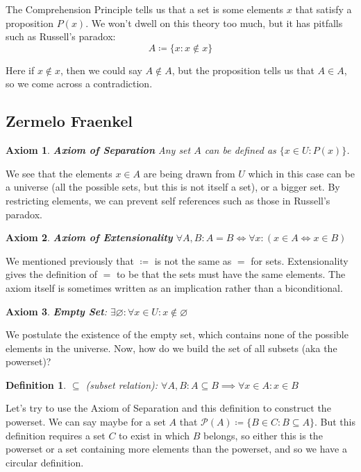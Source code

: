 \documentclass{article}
\newtheorem{defn}{Definition}[section]
\newtheorem{axm}{Axiom}[section]
\begin{document}
The Comprehension Principle tells us that a set is some elements $x$ that satisfy a proposition $P(x)$. We won't dwell on this theory too much, but it has pitfalls such as Russell's paradox:
\begin{equation*}
    A \coloneq \{x : x \notin x\}
\end{equation*}

Here if $x \notin x$, then we could say $A \notin A$, but the proposition tells us that $A \in A$, so we come across a contradiction.\\

\subsection{Zermelo Fraenkel}
\begin{axm}
    \textbf{Axiom of Separation} Any set $A$ can be defined as $\{x \in U : P(x)\}$.
\end{axm}
We see that the elements $x \in A$ are being drawn from $U$ which in this case can be a universe (all the possible sets, but this is not itself a set), or a bigger set. By restricting elements, we can prevent self references such as those in Russell's paradox.\\

\begin{axm}
    \textbf{Axiom of Extensionality} $\forall A, B: A = B \iff \forall x: (x \in A \iff x \in B)$
\end{axm}
We mentioned previously that $\coloneq$ is not the same as $=$ for sets. Extensionality gives the definition of $=$ to be that the sets must have the same elements. The axiom itself is sometimes written as an implication rather than a biconditional.\\

\begin{axm}
    \textbf{Empty Set}: $\exists \varnothing : \forall x \in U: x \notin \varnothing$
\end{axm}
We postulate the existence of the empty set, which contains none of the possible elements in the universe. Now, how do we build the set of all subsets (aka the powerset)?\\

\begin{defn}
    $\subseteq$ (subset relation): $\forall A, B: A \subseteq B \implies \forall x \in A: x \in B$
\end{defn}
Let's try to use the Axiom of Separation and this definition to construct the powerset. We can say maybe for a set $A$ that $\mathcal{P}(A) \coloneq \{B \in C: B \subseteq A\}$. But this definition requires a set $C$ to exist in which $B$ belongs, so either this is the powerset or a set containing more elements than the powerset, and so we have a circular definition.\\
\end{document}
